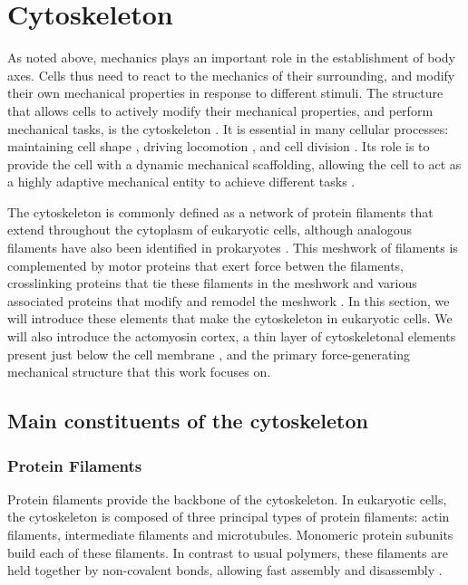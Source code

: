\section{Cytoskeleton}\label{sec:Cytoskeleton}
As noted above, mechanics plays an important role in the establishment of body axes. Cells thus need to react to the mechanics of their surrounding, and modify their own mechanical properties in response to different stimuli. The structure that allows cells to actively modify their mechanical properties, and perform mechanical tasks, is the cytoskeleton \citep{chaffey2003alberts,bray2001cell,fletcher2010cell}. It is essential in many cellular processes: maintaining cell shape \citep{chaffey2003alberts,rivero1996role,herrmann2007intermediate}, driving locomotion \citep{fletcher2010cell}, and cell division \citep{chaffey2003alberts,gonczy2001spindle}. Its role is to provide the cell with a dynamic mechanical scaffolding, allowing the cell to act as a highly adaptive mechanical entity to achieve different tasks \citep{chaffey2003alberts,bray2001cell,fletcher2010cell}.

The cytoskeleton is commonly defined as a network of protein filaments that extend throughout the cytoplasm of eukaryotic cells, although analogous filaments have also been identified in prokaryotes \citep{erickson2007evolution}. This meshwork of filaments is complemented by motor proteins that exert force betwen the filaments, crosslinking proteins that tie these filaments in the meshwork and various associated proteins that modify and remodel the meshwork \citep{chaffey2003alberts,bray2001cell,fletcher2010cell}. In this section, we will introduce these elements that make the cytoskeleton in eukaryotic cells. We will also introduce the actomyosin cortex, a thin layer of cytoskeletonal elements present just below the cell membrane \citep{chaffey2003alberts,salbreux2012actin}, and the primary force-generating mechanical structure that this work focuses on.

\subsection{Main constituents of the cytoskeleton}\label{subsec:ComponentsCytoskeleton}
\subsubsection{Protein Filaments}\label{subsubsec:FilamentsCytoskeleton}
Protein filaments provide the backbone of the cytoskeleton. In eukaryotic cells, the cytoskeleton is composed of three principal types of protein filaments: actin filaments, intermediate filaments and microtubules. Monomeric protein subunits build each of these filaments. In contrast to usual polymers, these filaments are held together by non-covalent bonds, allowing fast assembly and disassembly \citep{chaffey2003alberts}. 

